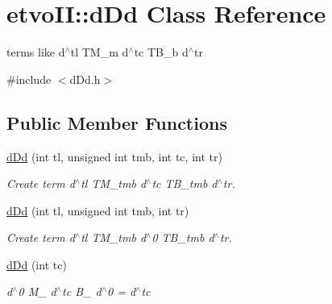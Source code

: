 \hypertarget{classetvo_i_i_1_1d_dd}{}\section{etvo\+II\+:\+:d\+Dd Class Reference}
\label{classetvo_i_i_1_1d_dd}


terms like d$^\wedge$tl T\+M\+\_\+m d$^\wedge$tc T\+B\+\_\+b d$^\wedge$tr  




{\ttfamily \#include $<$d\+Dd.\+h$>$}

\subsection*{Public Member Functions}
\begin{DoxyCompactItemize}
\item 
\mbox{\label{classetvo_i_i_1_1d_dd_ac5d18a7302f9ff9d61e505465f9c8a8d}} 
\mbox{\hyperlink{classetvo_i_i_1_1d_dd_ac5d18a7302f9ff9d61e505465f9c8a8d}{d\+Dd}} (int tl, unsigned int tmb, int tc, int tr)
\begin{DoxyCompactList}\small\item\em Create term d$^\wedge$tl T\+M\+\_\+tmb d$^\wedge$tc T\+B\+\_\+tmb d$^\wedge$tr. \end{DoxyCompactList}\item 
\mbox{\label{classetvo_i_i_1_1d_dd_a84893547f862bbc2cf95c97f30afbfcf}} 
\mbox{\hyperlink{classetvo_i_i_1_1d_dd_a84893547f862bbc2cf95c97f30afbfcf}{d\+Dd}} (int tl, unsigned int tmb, int tr)
\begin{DoxyCompactList}\small\item\em Create term d$^\wedge$tl T\+M\+\_\+tmb d$^\wedge$0 T\+B\+\_\+tmb d$^\wedge$tr. \end{DoxyCompactList}\item 
\mbox{\label{classetvo_i_i_1_1d_dd_ac27e487a693c81f5f30a2f34da45756f}} 
\mbox{\hyperlink{classetvo_i_i_1_1d_dd_ac27e487a693c81f5f30a2f34da45756f}{d\+Dd}} (int tc)
\begin{DoxyCompactList}\small\item\em d$^\wedge$0 M\+\_ d$^\wedge$tc B\+\_ d$^\wedge$0 = d$^\wedge$tc \end{DoxyCompactList}\item 
\mbox{\label{classetvo_i_i_1_1d_dd_a88e9d033203d8bc1e6c4526a6cf6e886}} 

\end{DoxyCompactItemize}
